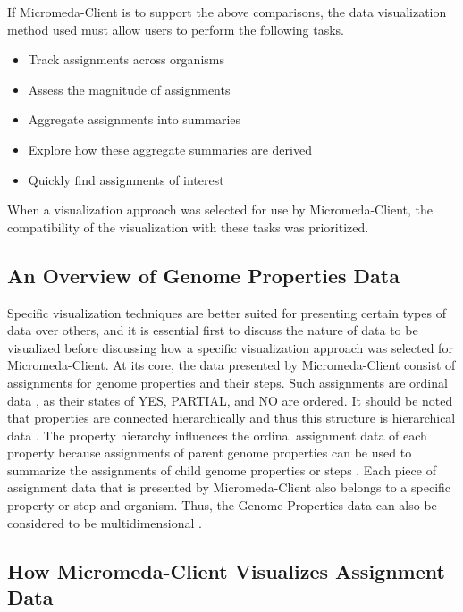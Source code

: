 If Micromeda-Client is to support the above comparisons, the data visualization method used must allow users to perform the following tasks.

\begin{itemize}
\item Track assignments across organisms
\item Assess the magnitude of assignments
\item Aggregate assignments into summaries
\item Explore how these aggregate summaries are derived
\item Quickly find assignments of interest
\end{itemize}

When a visualization approach was selected for use by Micromeda-Client, the compatibility of the visualization with these tasks was prioritized.

\subsection{An Overview of Genome Properties Data}

Specific visualization techniques are better suited for presenting certain types of data over others, and it is essential first to discuss the nature of data to be visualized before discussing how a specific visualization approach was selected for Micromeda-Client. At its core, the data presented by Micromeda-Client consist of assignments for genome properties and their steps. Such assignments are ordinal data \cite{richardson2018genome,agresti2010analysis}, as their states of YES, PARTIAL, and NO are ordered. It should be noted that properties are connected hierarchically \cite{richardson2018genome} and thus this structure is hierarchical data \cite{richardson2018genome,samet1990applications}. The property hierarchy influences the ordinal assignment data of each property because assignments of parent genome properties can be used to summarize the assignments of child genome properties or steps \cite{richardson2018genome}. Each piece of assignment data that is presented by Micromeda-Client also belongs to a specific property or step and organism. Thus, the Genome Properties data can also be considered to be multidimensional \cite{pedersen1999multidimensional}.

\subsection{How Micromeda-Client Visualizes Assignment Data}

